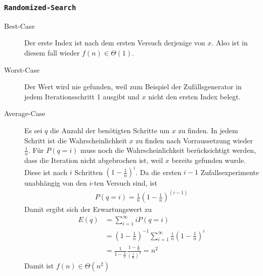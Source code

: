 \documentclass[11pt]{article}
\begin{document}
  \subsubsection*{\texttt{Randomized-Search}}
    \begin{description}
      \item[Best-Case] Der erste Index ist nach dem ersten Versuch derjenige von
        $x$. Also ist in diesem fall wieder $f(n) \in \Theta(1)$. 

      \item[Worst-Case] Der Wert wird nie gefunden, weil zum Beispiel der
        Zuf\"allsgenerator in jedem Iterationsschritt 1 ausgibt und 
        $x$ nicht den ersten Index belegt.

      \item[Average-Case] 
        Es sei $q$ die Anzahl der ben\"otigten Schritte um $x$ zu finden. 
        In jedem Schritt ist die Wahrscheinlichkeit $x$ zu finden nach Vorraussetzung
        wieder $\frac{1}{n}$. F\"ur $P(q=i)$ muss noch die Wahrscheinlichkeit
        ber\"ucksichtigt werden, dass die Iteration nicht abgebrochen ist, weil $x$
        bereits gefunden wurde. Diese ist nach $i$ Schritten 
        $\left( 1 - \frac{1}{n} \right)^i$. 
        Da die ersten $i-1$ Zufallsexperimente unabh\"angig von den $i$-ten
        Versuch sind, ist 
        \begin{align*}
          P(q=i)= \frac{1}{n} \left( 1 - \frac{1}{n} \right)^( i - 1 )
        \end{align*}
        Damit ergibt sich der Erwartungswert zu
        \begin{align*}
          E(q) & = \sum_{i=1}^{\infty} i P(q=i)  \\
               & = \left( 1 - \frac{1}{n} \right)^{-1} 
          \sum_{i=1}^{\infty} \frac{i}{n} \left( 1- \frac{1}{n} \right)^i  \\
          & = \frac{1}{ 1-\frac{1}{n} } 
          \frac{1-\frac{1}{n} }{\left( \frac{1}{n} \right)^2} = n^2 
        \end{align*}
        Damit ist $f(n) \in \Theta(n^2)$
    \end{description}
\end{document}
